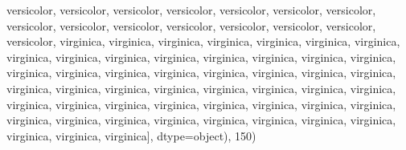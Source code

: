 \documentclass[letterpaper,10pt,english]{jupyterBook}
\begin{document}
\begin{sphinxVerbatimOutput}
\begin{sphinxVerbatim}[commandchars=\\\{\}]
        \PYGZsq{}versicolor\PYGZsq{}, \PYGZsq{}versicolor\PYGZsq{}, \PYGZsq{}versicolor\PYGZsq{}, \PYGZsq{}versicolor\PYGZsq{},
        \PYGZsq{}versicolor\PYGZsq{}, \PYGZsq{}versicolor\PYGZsq{}, \PYGZsq{}versicolor\PYGZsq{}, \PYGZsq{}versicolor\PYGZsq{},
        \PYGZsq{}versicolor\PYGZsq{}, \PYGZsq{}versicolor\PYGZsq{}, \PYGZsq{}versicolor\PYGZsq{}, \PYGZsq{}versicolor\PYGZsq{},
        \PYGZsq{}versicolor\PYGZsq{}, \PYGZsq{}versicolor\PYGZsq{}, \PYGZsq{}versicolor\PYGZsq{}, \PYGZsq{}virginica\PYGZsq{}, \PYGZsq{}virginica\PYGZsq{},
        \PYGZsq{}virginica\PYGZsq{}, \PYGZsq{}virginica\PYGZsq{}, \PYGZsq{}virginica\PYGZsq{}, \PYGZsq{}virginica\PYGZsq{}, \PYGZsq{}virginica\PYGZsq{},
        \PYGZsq{}virginica\PYGZsq{}, \PYGZsq{}virginica\PYGZsq{}, \PYGZsq{}virginica\PYGZsq{}, \PYGZsq{}virginica\PYGZsq{}, \PYGZsq{}virginica\PYGZsq{},
        \PYGZsq{}virginica\PYGZsq{}, \PYGZsq{}virginica\PYGZsq{}, \PYGZsq{}virginica\PYGZsq{}, \PYGZsq{}virginica\PYGZsq{}, \PYGZsq{}virginica\PYGZsq{},
        \PYGZsq{}virginica\PYGZsq{}, \PYGZsq{}virginica\PYGZsq{}, \PYGZsq{}virginica\PYGZsq{}, \PYGZsq{}virginica\PYGZsq{}, \PYGZsq{}virginica\PYGZsq{},
        \PYGZsq{}virginica\PYGZsq{}, \PYGZsq{}virginica\PYGZsq{}, \PYGZsq{}virginica\PYGZsq{}, \PYGZsq{}virginica\PYGZsq{}, \PYGZsq{}virginica\PYGZsq{},
        \PYGZsq{}virginica\PYGZsq{}, \PYGZsq{}virginica\PYGZsq{}, \PYGZsq{}virginica\PYGZsq{}, \PYGZsq{}virginica\PYGZsq{}, \PYGZsq{}virginica\PYGZsq{},
        \PYGZsq{}virginica\PYGZsq{}, \PYGZsq{}virginica\PYGZsq{}, \PYGZsq{}virginica\PYGZsq{}, \PYGZsq{}virginica\PYGZsq{}, \PYGZsq{}virginica\PYGZsq{},
        \PYGZsq{}virginica\PYGZsq{}, \PYGZsq{}virginica\PYGZsq{}, \PYGZsq{}virginica\PYGZsq{}, \PYGZsq{}virginica\PYGZsq{}, \PYGZsq{}virginica\PYGZsq{},
        \PYGZsq{}virginica\PYGZsq{}, \PYGZsq{}virginica\PYGZsq{}, \PYGZsq{}virginica\PYGZsq{}, \PYGZsq{}virginica\PYGZsq{}, \PYGZsq{}virginica\PYGZsq{},
        \PYGZsq{}virginica\PYGZsq{}, \PYGZsq{}virginica\PYGZsq{}, \PYGZsq{}virginica\PYGZsq{}], dtype=object),
 150)
\end{sphinxVerbatim}
\end{sphinxVerbatimOutput}
\begin{sphinxVerbatimInput}

\begin{sphinxVerbatim}[commandchars=\\\{\}]
 
\end{sphinxVerbatim}
\end{sphinxVerbatimInput}
\end{document}

